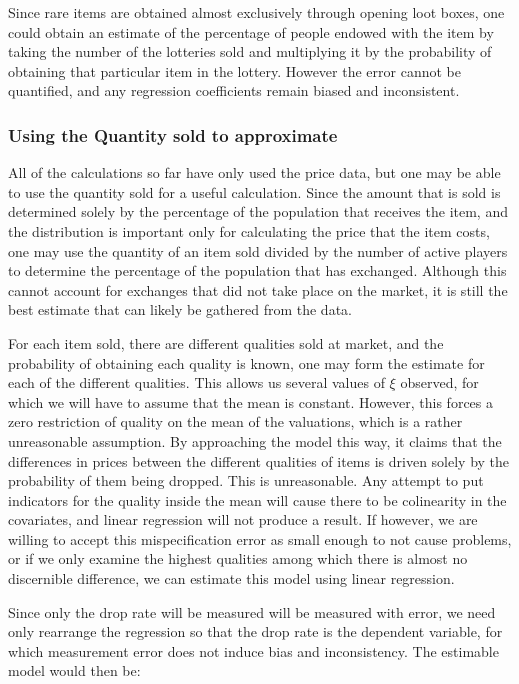 \documentclass[12pt, letterpaper]{paper}
\begin{document}
Since rare items are obtained almost exclusively through opening loot
boxes, one could obtain an estimate of the percentage of people
endowed with the item by taking the number of the lotteries sold and
multiplying it by the probability of obtaining that particular item in
the lottery. However the error cannot be quantified, and any
regression coefficients remain biased and inconsistent.

\subsubsection{Using the Quantity sold to approximate}
\label{sec-2-2-2}

All of the calculations so far have only used the price data, but one
may be able to use the quantity sold for a useful calculation. Since
the amount that is sold is determined solely by the percentage of the
population that receives the item, and the distribution is important
only for calculating the price that the item costs, one may use the
quantity of an item sold divided by the number of active players to
determine the percentage of the population that has
exchanged. Although this cannot account for exchanges that did not
take place on the market, it is still the best estimate that can
likely be gathered from the data.

For each item sold, there are different qualities
sold at market, and the probability of obtaining each quality is
known, one may form the estimate for each of the different
qualities. This allows us several values of $\xi$ observed, for which we
will have to assume that the mean is constant. However, this forces a
zero restriction of quality on the mean of the valuations, which is a
rather unreasonable assumption. By approaching the model this way, it
claims that the differences in prices between the different qualities
of items is driven solely by the probability of them being
dropped. This is unreasonable. Any attempt to put indicators for the
quality inside the mean will cause there to be colinearity in the
covariates, and linear regression will not produce a result. 
If however, we are willing to accept this mispecification error as
small enough to not cause problems, or if we only examine the highest
qualities among which there is almost no discernible difference, we
can estimate this model using linear regression. 

Since only the drop rate will be measured will be measured with error,
we need only rearrange the regression so that the drop rate is the
dependent variable, for which measurement error does not induce bias
and inconsistency. The estimable model would then be:
\end{document}
